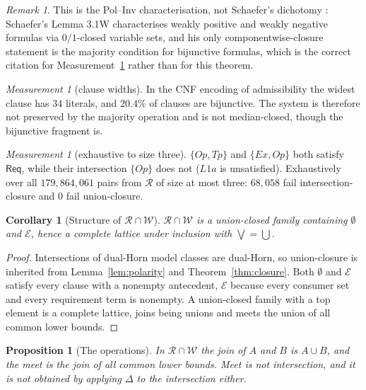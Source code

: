 \documentclass[11pt]{article}
\theoremstyle{definition}
\theoremstyle{plain}
\newtheorem{proposition}[definition]{Proposition}
\newtheorem{corollary}[definition]{Corollary}
\theoremstyle{remark}
\newtheorem{measurement}[definition]{Measurement}
\newtheorem{remark}[definition]{Remark}
\newcommand{\El}{\mathcal{E}}
\newcommand{\Law}{\mathsf{Req}}
\begin{document}
\begin{remark}
This is the Pol--Inv characterisation, not Schaefer's dichotomy
\cite{schaefer1978}: Schaefer's Lemma 3.1W characterises weakly positive and
weakly negative formulas via $0/1$-closed variable sets, and his only
componentwise-closure statement is the majority condition for bijunctive
formulas, which is the correct citation for
Measurement~\ref{meas:arity} rather than for this theorem.
\end{remark}

\begin{measurement}[clause widths]\label{meas:arity}
In the CNF encoding of admissibility the widest clause has $34$ literals, and
$20.4\%$ of clauses are bijunctive. The system is therefore not preserved by the
majority operation and is not median-closed, though the bijunctive fragment is.
\end{measurement}

\begin{measurement}[exhaustive to size three]\label{meas:closureprops}
$\{Op,Tp\}$ and $\{Ex,Op\}$ both satisfy $\Law$, while their intersection
$\{Op\}$ does not ($L1a$ is unsatisfied). Exhaustively over all $179{,}864{,}061$ pairs from $\mathcal{R}$ of size at most
three: $68{,}058$ fail intersection-closure and $0$ fail union-closure.
\end{measurement}

\begin{corollary}[Structure of $\mathcal{R} \cap \mathcal{W}$]\label{cor:lattice}
$\mathcal{R} \cap \mathcal{W}$ is a union-closed family containing $\emptyset$
and $\El$, hence a complete lattice under inclusion with $\bigvee = \bigcup$.
\end{corollary}

\begin{proof}
Intersections of dual-Horn model classes are dual-Horn, so union-closure is
inherited from Lemma~\ref{lem:polarity} and Theorem~\ref{thm:closure}. Both $\emptyset$ and $\El$ satisfy every clause with a nonempty antecedent,
$\El$ because every consumer set and every requirement term is nonempty. A
union-closed family with a top element is a complete lattice, joins being unions
and meets the union of all common lower bounds.
\end{proof}

\begin{proposition}[The operations]\label{prop:joinmeet}
In $\mathcal{R} \cap \mathcal{W}$ the join of $A$ and $B$ is $A \cup B$, and the
meet is the join of all common lower bounds. Meet is not intersection, and it is
not obtained by applying $\Delta$ to the intersection either.
\end{proposition}
\end{document}
